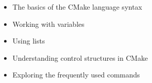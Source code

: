 \begin{itemize}
\item
The basics of the CMake language syntax

\item
Working with variables

\item
Using lists

\item
Understanding control structures in CMake

\item
Exploring the frequently used commands
\end{itemize}


































